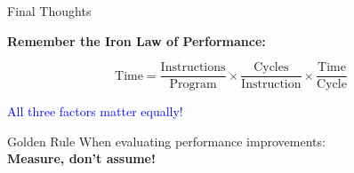 \documentclass[aspectratio=169,12pt]{beamer}
\begin{document}
\begin{frame}{Final Thoughts}
\centering
\Large

\vspace{1cm}
\textbf{Remember the Iron Law of Performance:}

\vspace{0.5cm}
\huge
$$\text{Time} = \frac{\text{Instructions}}{\text{Program}} \times \frac{\text{Cycles}}{\text{Instruction}} \times \frac{\text{Time}}{\text{Cycle}}$$

\vspace{1cm}
\Large
\textcolor{blue}{All three factors matter equally!}

\vspace{1cm}
\normalsize
\begin{block}{Golden Rule}
When evaluating performance improvements:\\
\textbf{Measure, don't assume!}
\end{block}
\end{frame}
\end{document}
